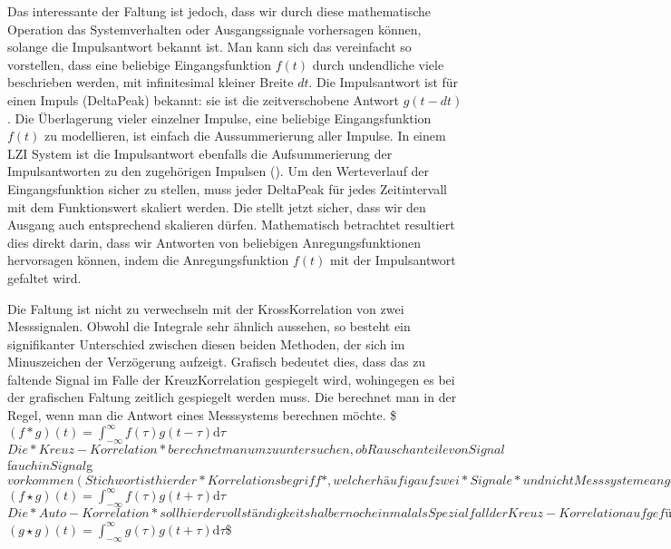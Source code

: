 \documentclass[letterpaper,10pt,english]{jupyterBook}
\begin{document}
\sphinxAtStartPar
Das interessante der Faltung ist jedoch, dass wir durch diese mathematische Operation das Systemverhalten oder Ausgangssignale vorhersagen können, solange die Impulsantwort bekannt ist. Man kann sich das vereinfacht so vorstellen, dass eine beliebige Eingangsfunktion \(f(t)\) durch undendliche viele  beschrieben werden, mit infinitesimal kleiner Breite \(dt\). Die Impulsantwort ist für einen Impuls (Delta\sphinxhyphen{}Peak) bekannt: sie ist die zeitverschobene Antwort \(g(t-dt)\). Die Überlagerung vieler einzelner Impulse, eine beliebige Eingangsfunktion \(f(t)\) zu modellieren, ist einfach die Aussummerierung aller Impulse. In einem LZI System ist die Impulsantwort ebenfalls die Aufsummerierung der Impulsantworten zu den zugehörigen Impulsen ().
Um den  Werteverlauf der Eingangsfunktion sicher zu stellen, muss jeder Delta\sphinxhyphen{}Peak für jedes Zeitintervall mit dem Funktionswert skaliert werden.
Die  stellt jetzt sicher, dass wir den Ausgang auch entsprechend skalieren dürfen.
Mathematisch betrachtet resultiert dies direkt darin, dass wir Antworten von beliebigen Anregungsfunktionen hervorsagen können, indem die Anregungsfunktion \(f(t)\) mit der Impulsantwort gefaltet wird.

\sphinxAtStartPar
{}

\sphinxAtStartPar
Die Faltung ist nicht zu verwechseln mit der Kross\sphinxhyphen{}Korrelation von zwei Messsignalen. Obwohl die Integrale sehr ähnlich aussehen, so besteht ein signifikanter Unterschied zwischen diesen beiden Methoden, der sich im Minuszeichen der Verzögerung aufzeigt. Grafisch bedeutet dies, dass das zu faltende Signal im Falle der Kreuz\sphinxhyphen{}Korrelation  gespiegelt wird, wohingegen es bei der grafischen Faltung zeitlich gespiegelt werden muss.
Die  berechnet man in der Regel, wenn man die Antwort eines Messsystems berechnen möchte.
\$\((f \ast g)(t) = \int_{-\infty}^{\infty} f(\tau)g(t-\tau) \mathrm{d}\tau\)\(
Die *Kreuz-Korrelation* berechnet man um zu untersuchen, ob Rauschanteile von Signal \)f\( auch in Signal \)g\( vorkommen (Stichwort ist hier der *Korrelationsbegriff*, welcher häufig auf zwei *Signale* und nicht Messsysteme angewendet wird).
\)\((f \star g)(t) = \int_{-\infty}^{\infty} f(\tau)g(t+\tau) \mathrm{d}\tau\)\(
Die *Auto-Korrelation* soll hier der vollständigkeitshalber noch einmal als Spezialfall der Kreuz-Korrelation aufgeführt werden. Hier berechnet man, wie ähnlich ein zeit-verschobenes Signal zu sich selbst ist (*zeitliche Korrelation*). 
\)\((g \star g)(t) = \int_{-\infty}^{\infty} g(\tau)g(t+\tau) \mathrm{d}\tau\)\$
\end{document}
